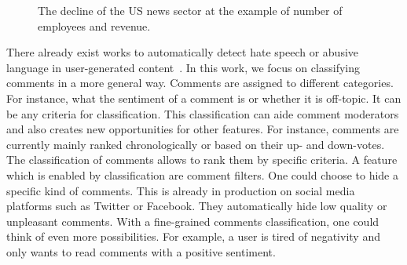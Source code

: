\begin{figure}
    \centering
    \caption{The decline of the US news sector at the example of number of employees and revenue.}
    \label{fig:decline_of_newspapers}
\end{figure}


 There already exist works to automatically detect hate speech or abusive language in user-generated content~\cite{hateoffensive, Nobata:2016:ALD:2872427.2883062, risch_delete_nodate, schmidt2017survey}. In this work, we focus on classifying comments in a more general way.
Comments are assigned to different categories. For instance, what the sentiment of a comment is or whether it is off-topic.
It can be any criteria for classification.
This classification can aide comment moderators and also creates new opportunities for other features. For instance, comments are currently mainly ranked chronologically or based on their up- and down-votes. The classification of comments allows to rank them by specific criteria. A feature which is enabled by classification are comment filters. One could choose to hide a specific kind of comments. This is already in production on social media platforms such as Twitter or Facebook. They automatically hide low quality or unpleasant comments. With a fine-grained comments classification, one could think of even more possibilities. For example, a user is tired of negativity and only wants to read comments with a positive sentiment.

